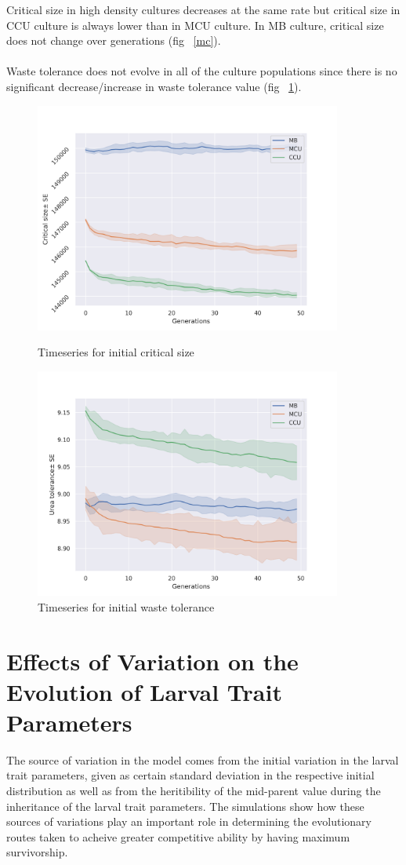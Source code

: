 \newpage
Critical size in high density cultures decreases at the same rate but critical size in CCU culture is always lower than in MCU culture. In MB culture, critical size does not change over generations (fig ~\ref{mc}). \\\\
Waste tolerance does not evolve in all of the culture populations since there is no significant decrease/increase in waste tolerance value (fig ~\ref{wtol}).
\newpage
\begin{figure}[h]
  \centering
  \includegraphics[width=0.9\textwidth]{C4/Figs/mc}
  \caption{Timeseries for initial critical size}
  \label{mc}
  \includegraphics[width=0.9\textwidth]{C4/Figs/wtol}
  \caption{Timeseries for initial waste tolerance}
  \label{wtol}
\end{figure}
\newpage
\section{Effects of Variation on the Evolution of Larval Trait Parameters}
The source of variation in the model comes from the initial variation in the larval trait parameters, given as certain standard deviation in the respective initial distribution as well as from the heritibility of the mid-parent value during the inheritance of the larval trait parameters. The simulations show how these sources of variations play an important role in determining the evolutionary routes taken to acheive greater competitive ability by having maximum survivorship.
